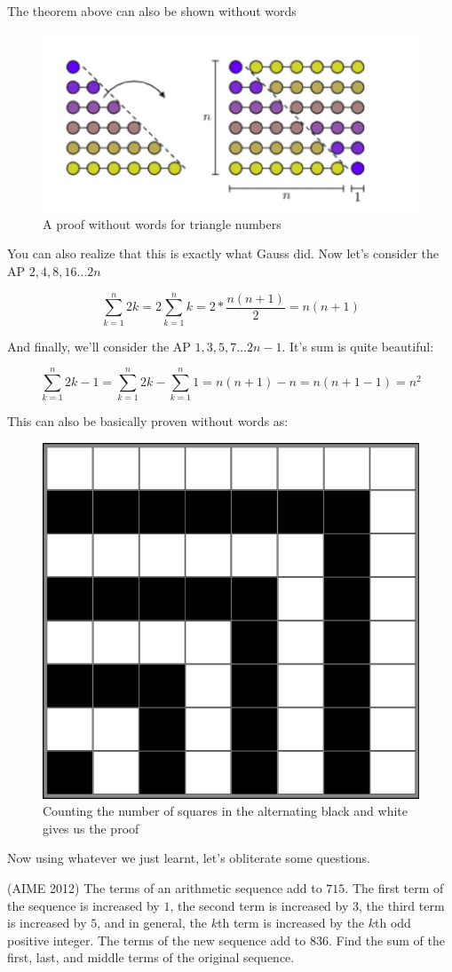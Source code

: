 The theorem above can also be shown without words 
\begin{figure}
    \centering
    \includegraphics[width=0.5\linewidth]{Photos/triangle numbers.png}
    \caption{A proof without words for triangle numbers}
\end{figure}
You can also realize that this is exactly what Gauss did.
Now let's consider the AP $2,4,8,16 \dots 2n$
\begin{theorem}
    \[\sum^n_{k=1}2k=2\sum^n_{k=1}k=2*\frac{n(n+1)}{2}=n(n+1)\]
\end{theorem}
And finally, we'll consider the AP $1,3,5,7 \dots 2n-1$. It's sum is quite beautiful:\\
\begin{theorem}
    \[\sum^n_{k=1}2k-1=\sum^n_{k=1}2k-\sum^n_{k=1}1=n(n+1)-n=n(n+1-1)=n^2\]
\end{theorem}
This can also be basically proven without words as:\\
\begin{figure}
    \centering
    \includegraphics[width=0.5\linewidth]{Photos/Sum of odds.png}
    \caption{Counting the number of squares in the alternating black and white gives us the proof}
    
\end{figure}
Now using whatever we just learnt, let's obliterate some questions.\\
\begin{example}
    (AIME 2012) The terms of an arithmetic sequence add to $715$. The first term of the sequence is increased by $1$, the second term is increased by $3$, the third term is increased by $5$, and in general, the $k$th term is increased by the $k$th odd positive integer. The terms of the new sequence add to $836$. Find the sum of the first, last, and middle terms of the original sequence.
\end{example}
